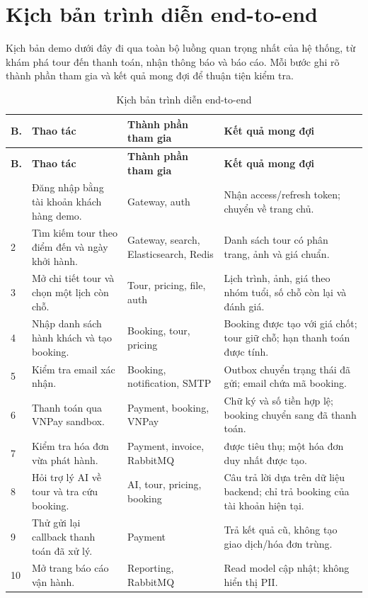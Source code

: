 \section{Kịch bản trình diễn end-to-end}
\label{sec:kich-ban-demo}

Kịch bản demo dưới đây đi qua toàn bộ luồng quan trọng nhất của hệ thống, từ khám phá tour đến thanh toán, nhận thông báo và báo cáo. Mỗi bước ghi rõ thành phần tham gia và kết quả mong đợi để thuận tiện kiểm tra.

\begin{longtable}{@{}L{0.9cm}L{4.0cm}L{4.4cm}L{4.2cm}@{}}
\caption{Kịch bản trình diễn end-to-end}
\label{tab:demo}\\
\toprule
\textbf{B.} & \textbf{Thao tác} & \textbf{Thành phần tham gia} & \textbf{Kết quả mong đợi}\\
\midrule
\endfirsthead
\toprule
\textbf{B.} & \textbf{Thao tác} & \textbf{Thành phần tham gia} & \textbf{Kết quả mong đợi}\\
\midrule
\endhead
\bottomrule
{} & Đăng nhập bằng tài khoản khách hàng demo. & Gateway, auth & Nhận access/refresh token; chuyển về trang chủ.\\
2 & Tìm kiếm tour theo điểm đến và ngày khởi hành. & Gateway, search, Elasticsearch, Redis & Danh sách tour có phân trang, ảnh và giá chuẩn.\\
3 & Mở chi tiết tour và chọn một lịch còn chỗ. & Tour, pricing, file, auth & Lịch trình, ảnh, giá theo nhóm tuổi, số chỗ còn lại và đánh giá.\\
4 & Nhập danh sách hành khách và tạo booking. & Booking, tour, pricing & Booking được tạo với giá chốt; tour giữ chỗ; hạn thanh toán được tính.\\
5 & Kiểm tra email xác nhận. & Booking, notification, SMTP & Outbox chuyển trạng thái đã gửi; email chứa mã booking.\\
6 & Thanh toán qua VNPay sandbox. & Payment, booking, VNPay & Chữ ký và số tiền hợp lệ; booking chuyển sang đã thanh toán.\\
7 & Kiểm tra hóa đơn vừa phát hành. & Payment, invoice, RabbitMQ &  được tiêu thụ; một hóa đơn duy nhất được tạo.\\
8 & Hỏi trợ lý AI về tour và tra cứu booking. & AI, tour, pricing, booking & Câu trả lời dựa trên dữ liệu backend; chỉ trả booking của tài khoản hiện tại.\\
9 & Thử gửi lại callback thanh toán đã xử lý. & Payment & Trả kết quả cũ, không tạo giao dịch/hóa đơn trùng.\\
10 & Mở trang báo cáo vận hành. & Reporting, RabbitMQ & Read model  cập nhật; không hiển thị PII.\\
\end{longtable}

